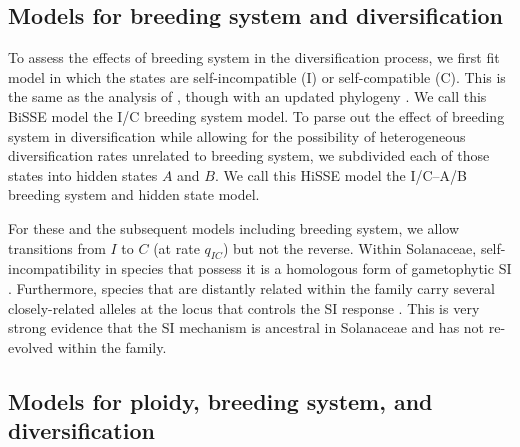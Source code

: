 \subsection{Models for breeding system and diversification}

To assess the effects of breeding system in the diversification process, we first fit model in which the states are self-incompatible (I) or self-compatible (C).
This is the same as the analysis of \citet{goldberg_2010}, though with an updated phylogeny \citep{sarkinen_2013}.
We call this BiSSE model the I/C breeding system model. 
To parse out the effect of breeding system in diversification while allowing for the possibility of heterogeneous diversification rates unrelated to breeding system, we subdivided each of those states into hidden states $A$ and $B$.
We call this HiSSE model the I/C--A/B breeding system and hidden state model. 

For these and the subsequent models including breeding system, we allow transitions from $I$ to $C$ (at rate $q_{IC}$) but not the reverse.
Within Solanaceae, self-incompatibility in species that possess it is a homologous form of gametophytic SI \citep[shared even shared even with other dicot families;][]{igic_2001, steinbachs_2002}.
Furthermore, species that are distantly related within the family carry several closely-related alleles at the locus that controls the SI response \citep{ioerger_1990, igic_2006}.
This is very strong evidence that the SI mechanism is ancestral in Solanaceae and has not re-evolved within the family.

\subsection{Models for ploidy, breeding system, and diversification}

